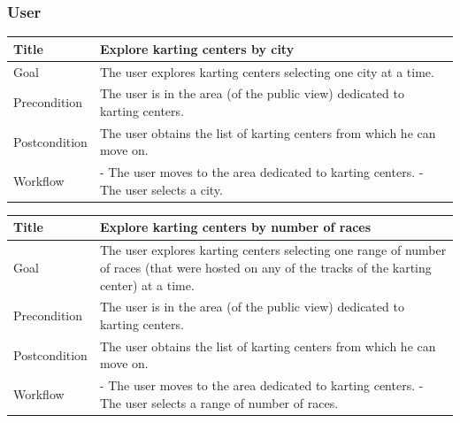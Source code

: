 \documentclass{beamer}
\begin{document}
\begin{frame}
\frametitle{User}
\begin{table}
    \tiny
    \begin{tabular}{|p{2cm}|p{6cm}|}
    \hline
    Title & \textbf{Explore karting centers by city} \\
    \hline
    Goal & The user explores karting centers selecting one city at a time. \\
    \hline
    Precondition & The user is in the area (of the public view) dedicated to karting centers.\\
    \hline
    Postcondition & The user obtains the list of karting centers from which he can move on.\\
    \hline
    Workflow &
    - The user moves to the area dedicated to karting centers. \newline
    - The user selects a city. \\
    \hline
    \end{tabular}
\end{table}

    \begin{table}
        \tiny
        \begin{tabular}{|p{2cm}|p{6cm}|}
        \hline
        Title & \textbf{Explore karting centers by number of races} \\
        \hline
        Goal & The user explores karting centers selecting one range of number of races (that
        were hosted on any of the tracks of the karting center) at a time. \\
        \hline
        Precondition & The user is in the area (of the public view) dedicated to karting centers.\\
        \hline
        Postcondition & The user obtains the list of karting centers from which he can move on.\\
        \hline
        Workflow &
        - The user moves to the area dedicated to karting centers. \newline
        - The user selects a range of number of races. \\
        \hline
        \end{tabular}
\end{table}
\end{frame}


\end{document}
